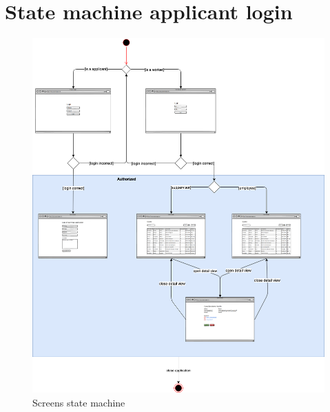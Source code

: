 \section{State machine applicant login}
\begin{figure}[htb!]
    \centering
    \includegraphics[width=\textwidth]{img/stm-screens.png}
    \caption{Screens state machine}
\end{figure}